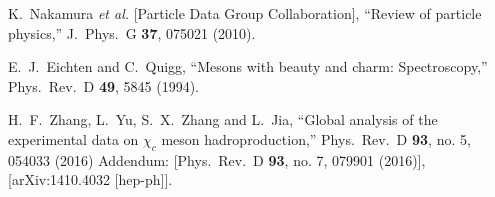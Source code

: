 \documentclass[12pt,a4paper,final]{iopart}
\begin{document}
\begin{thebibliography}{100}
  K.~Nakamura {\it et al.}  [Particle Data Group Collaboration],
  ``Review of particle physics,''
  J.\ Phys.\ G {\bf 37}, 075021 (2010).


  E.~J.~Eichten and C.~Quigg,
  ``Mesons with beauty and charm: Spectroscopy,''
  Phys.\ Rev.\ D {\bf 49}, 5845 (1994).



  H.~F.~Zhang, L.~Yu, S.~X.~Zhang and L.~Jia,
  ``Global analysis of the experimental data on $\chi_c$ meson hadroproduction,''
  Phys.\ Rev.\ D {\bf 93}, no. 5, 054033 (2016) Addendum: [Phys.\ Rev.\ D {\bf 93}, no. 7, 079901 (2016)], 
  [arXiv:1410.4032 [hep-ph]].

 
\end{thebibliography}
\end{document}
